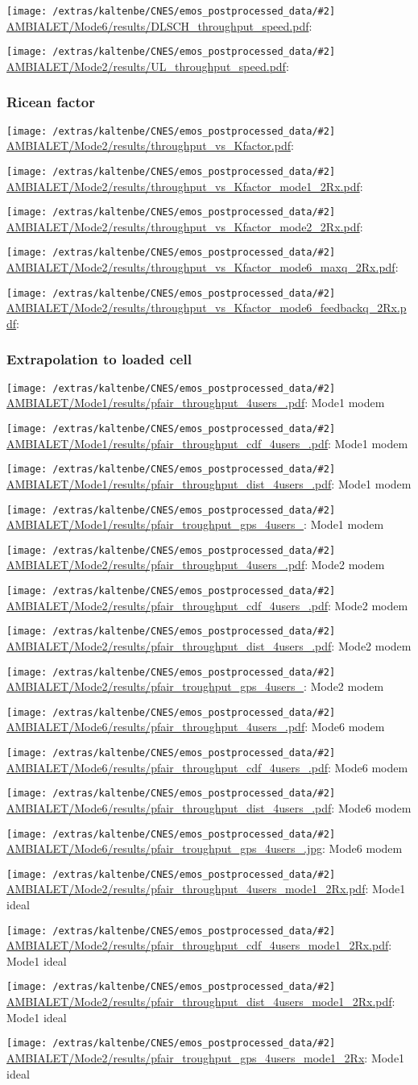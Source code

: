 \documentclass[a4paper,10pt]{article}
\newcommand{\printfile}[2][]{
 \begin{minipage}{8cm}
  \centering
  \texttt{[image: /extras/kaltenbe/CNES/emos\_postprocessed\_data/\#2]}
  \url{#2}: #1

 \end{minipage}
}
\begin{document}
\printfile{AMBIALET/Mode6/results/DLSCH_throughput_speed.pdf}
\printfile{AMBIALET/Mode2/results/UL_throughput_speed.pdf}

\subsubsection{Ricean factor}

\printfile{AMBIALET/Mode2/results/throughput_vs_Kfactor.pdf}

\printfile{AMBIALET/Mode2/results/throughput_vs_Kfactor_mode1_2Rx.pdf}
\printfile{AMBIALET/Mode2/results/throughput_vs_Kfactor_mode2_2Rx.pdf}

\printfile{AMBIALET/Mode2/results/throughput_vs_Kfactor_mode6_maxq_2Rx.pdf}
\printfile{AMBIALET/Mode2/results/throughput_vs_Kfactor_mode6_feedbackq_2Rx.pdf}


\subsubsection{Extrapolation to loaded cell}

\printfile[Mode1 modem]{AMBIALET/Mode1/results/pfair_throughput_4users_.pdf}
\printfile[Mode1 modem]{AMBIALET/Mode1/results/pfair_throughput_cdf_4users_.pdf}

\printfile[Mode1 modem]{AMBIALET/Mode1/results/pfair_throughput_dist_4users_.pdf}
\printfile[Mode1 modem]{AMBIALET/Mode1/results/pfair_troughput_gps_4users_}

\printfile[Mode2 modem]{AMBIALET/Mode2/results/pfair_throughput_4users_.pdf}
\printfile[Mode2 modem]{AMBIALET/Mode2/results/pfair_throughput_cdf_4users_.pdf}

\printfile[Mode2 modem]{AMBIALET/Mode2/results/pfair_throughput_dist_4users_.pdf}
\printfile[Mode2 modem]{AMBIALET/Mode2/results/pfair_troughput_gps_4users_}

\printfile[Mode6 modem]{AMBIALET/Mode6/results/pfair_throughput_4users_.pdf}
\printfile[Mode6 modem]{AMBIALET/Mode6/results/pfair_throughput_cdf_4users_.pdf}

\printfile[Mode6 modem]{AMBIALET/Mode6/results/pfair_throughput_dist_4users_.pdf}
\printfile[Mode6 modem]{AMBIALET/Mode6/results/pfair_troughput_gps_4users_.jpg}

\printfile[Mode1 ideal]{AMBIALET/Mode2/results/pfair_throughput_4users_mode1_2Rx.pdf}
\printfile[Mode1 ideal]{AMBIALET/Mode2/results/pfair_throughput_cdf_4users_mode1_2Rx.pdf}

\printfile[Mode1 ideal]{AMBIALET/Mode2/results/pfair_throughput_dist_4users_mode1_2Rx.pdf}
\printfile[Mode1 ideal]{AMBIALET/Mode2/results/pfair_troughput_gps_4users_mode1_2Rx}
\end{document}
